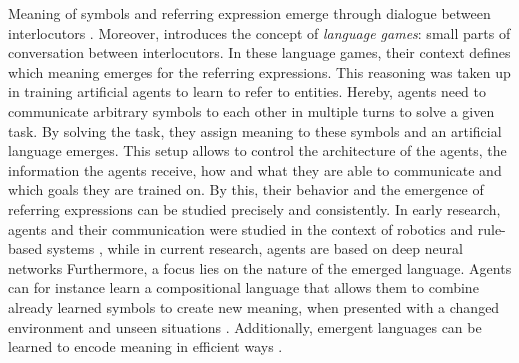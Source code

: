 Meaning of symbols and referring expression emerge through dialogue between interlocutors \citep{Wittgenstein1953,Clark1986}.
Moreover, \citet{Wittgenstein1953} introduces the concept of \emph{language games}: small parts of conversation between interlocutors.
In these language games, their context defines which meaning emerges for the referring expressions.
This reasoning was taken up in training artificial agents to learn to refer to entities.
Hereby, agents need to communicate arbitrary symbols to each other in multiple turns to solve a given task.
By solving the task, they assign meaning to these symbols and an artificial language emerges.
This setup allows to control the architecture of the agents, the information the agents receive, how and what they are able to communicate and which goals they are trained on.
By this, their behavior and the emergence of referring expressions can be studied precisely and consistently.
In early research, agents and their communication were studied in the context of robotics and rule-based systems \citep{Steels2009,Roy2002,Kirby2002,Kirby2008}, while in current research, agents are based on deep neural networks \citep{Lazaridou2017,Baroni2020,Baroni2022,Kottur2017}
Furthermore, a focus lies on the nature of the emerged language.
Agents can for instance learn a compositional language that allows them to combine already learned symbols to create new meaning, when presented with a changed environment and unseen situations \citep{Kharitonov2020,Lazaridou2018,Gupta2020}.
Additionally, emergent languages can be learned to encode meaning in efficient ways \citep{Chaabouni2019,Zaslavsky2018}.


